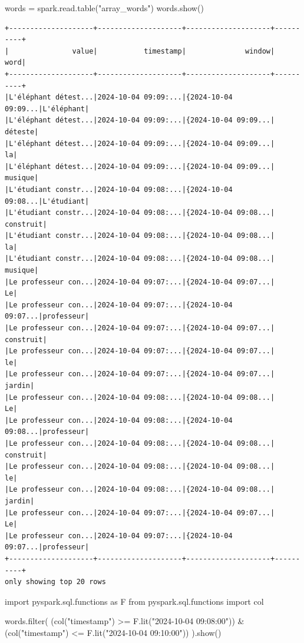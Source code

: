 \documentclass[
  letterpaper,
  DIV=11,
  numbers=noendperiod]{scrartcl}
\newenvironment{Shaded}{\begin{snugshade}}{\end{snugshade}}
\newcommand{\BuiltInTok}[1]{\textcolor[rgb]{0.00,0.23,0.31}{#1}}
\newcommand{\ImportTok}[1]{\textcolor[rgb]{0.00,0.46,0.62}{#1}}
\newcommand{\NormalTok}[1]{\textcolor[rgb]{0.00,0.23,0.31}{#1}}
\newcommand{\OperatorTok}[1]{\textcolor[rgb]{0.37,0.37,0.37}{#1}}
\newcommand{\StringTok}[1]{\textcolor[rgb]{0.13,0.47,0.30}{#1}}
\begin{document}
\begin{Shaded}
\begin{Highlighting}[]
\NormalTok{words }\OperatorTok{=}\NormalTok{ spark.read.table(}\StringTok{"array\_words"}\NormalTok{)}
\NormalTok{words.show()}
\end{Highlighting}
\end{Shaded}

\begin{verbatim}
+--------------------+--------------------+--------------------+----------+
|               value|           timestamp|              window|      word|
+--------------------+--------------------+--------------------+----------+
|L'éléphant détest...|2024-10-04 09:09:...|{2024-10-04 09:09...|L'éléphant|
|L'éléphant détest...|2024-10-04 09:09:...|{2024-10-04 09:09...|   déteste|
|L'éléphant détest...|2024-10-04 09:09:...|{2024-10-04 09:09...|        la|
|L'éléphant détest...|2024-10-04 09:09:...|{2024-10-04 09:09...|   musique|
|L'étudiant constr...|2024-10-04 09:08:...|{2024-10-04 09:08...|L'étudiant|
|L'étudiant constr...|2024-10-04 09:08:...|{2024-10-04 09:08...| construit|
|L'étudiant constr...|2024-10-04 09:08:...|{2024-10-04 09:08...|        la|
|L'étudiant constr...|2024-10-04 09:08:...|{2024-10-04 09:08...|   musique|
|Le professeur con...|2024-10-04 09:07:...|{2024-10-04 09:07...|        Le|
|Le professeur con...|2024-10-04 09:07:...|{2024-10-04 09:07...|professeur|
|Le professeur con...|2024-10-04 09:07:...|{2024-10-04 09:07...| construit|
|Le professeur con...|2024-10-04 09:07:...|{2024-10-04 09:07...|        le|
|Le professeur con...|2024-10-04 09:07:...|{2024-10-04 09:07...|    jardin|
|Le professeur con...|2024-10-04 09:08:...|{2024-10-04 09:08...|        Le|
|Le professeur con...|2024-10-04 09:08:...|{2024-10-04 09:08...|professeur|
|Le professeur con...|2024-10-04 09:08:...|{2024-10-04 09:08...| construit|
|Le professeur con...|2024-10-04 09:08:...|{2024-10-04 09:08...|        le|
|Le professeur con...|2024-10-04 09:08:...|{2024-10-04 09:08...|    jardin|
|Le professeur con...|2024-10-04 09:07:...|{2024-10-04 09:07...|        Le|
|Le professeur con...|2024-10-04 09:07:...|{2024-10-04 09:07...|professeur|
+--------------------+--------------------+--------------------+----------+
only showing top 20 rows
\end{verbatim}

\begin{Shaded}
\begin{Highlighting}[]
\ImportTok{import}\NormalTok{ pyspark.sql.functions }\ImportTok{as}\NormalTok{ F}
\ImportTok{from}\NormalTok{ pyspark.sql.functions }\ImportTok{import}\NormalTok{ col}

\NormalTok{words.}\BuiltInTok{filter}\NormalTok{(}
\NormalTok{    (col(}\StringTok{"timestamp"}\NormalTok{) }\OperatorTok{\textgreater{}=}\NormalTok{ F.lit(}\StringTok{"2024{-}10{-}04 09:08:00"}\NormalTok{)) }\OperatorTok{\&} 
\NormalTok{    (col(}\StringTok{"timestamp"}\NormalTok{) }\OperatorTok{\textless{}=}\NormalTok{ F.lit(}\StringTok{"2024{-}10{-}04 09:10:00"}\NormalTok{))}
\NormalTok{).show()}
\end{Highlighting}
\end{Shaded}
\end{document}
